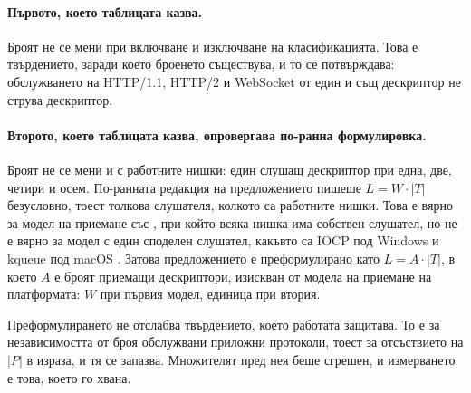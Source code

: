 
\paragraph{Първото, което таблицата казва.} Броят не се мени при включване и изключване на
класификацията. Това е твърдението, заради което броенето съществува, и то се потвърждава:
обслужването на HTTP/1.1, HTTP/2 и WebSocket от един и същ дескриптор не струва дескриптор.

\paragraph{Второто, което таблицата казва, опровергава по-ранна формулировка.} Броят не се
мени и с работните нишки: един слушащ дескриптор при една, две, четири и осем. По-ранната
редакция на предложението пишеше \(L = W \cdot |T|\) безусловно, тоест толкова слушателя,
колкото са работните нишки. Това е вярно за модел на приемане със , при
който всяка нишка има собствен слушател, но не е вярно за модел с един споделен слушател,
какъвто са IOCP под Windows и kqueue под macOS . Затова
предложението е преформулирано като \(L = A \cdot |T|\), в което \(A\) е броят приемащи
дескриптори, изискван от модела на приемане на платформата: \(W\) при първия модел, единица
при втория.

Преформулирането не отслабва твърдението, което работата защитава. То е за независимостта от
броя обслужвани приложни протоколи, тоест за отсъствието на \(|P|\) в израза, и тя се
запазва. Множителят пред нея беше сгрешен, и измерването е това, което го хвана.

